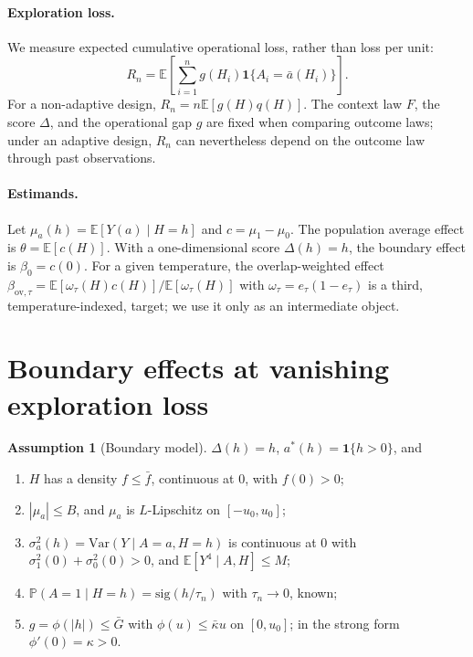 \documentclass[12pt]{article}
\theoremstyle{definition}
\newtheorem{assumption}{Assumption}
\theoremstyle{remark}
\newcommand{\E}{\mathbb{E}}
\newcommand{\Prob}{\mathbb{P}}
\newcommand{\Var}{\mathrm{Var}}
\newcommand{\ov}{\mathrm{ov}}
\newcommand{\sgm}{\mathrm{sig}}
\begin{document}
\paragraph{Exploration loss.}
We measure expected cumulative operational loss, rather than loss per unit:
\begin{equation}\label{eq:loss-definition}
 R_n=\E\left[\sum_{i=1}^n g(H_i)\mathbf 1\{A_i=\bar a(H_i)\}\right].
\end{equation}
For a non-adaptive design, $R_n=n\E[g(H)q(H)]$. The context law $F$, the score
$\Delta$, and the operational gap $g$ are fixed when comparing outcome laws;
under an adaptive design, $R_n$ can nevertheless depend on the outcome law
through past observations.

\paragraph{Estimands.} Let $\mu_a(h)=\E[Y(a)\mid H=h]$ and $c=\mu_1-\mu_0$.
The population average effect is $\theta=\E[c(H)]$. With a one-dimensional
score $\Delta(h)=h$, the boundary effect is $\beta_0=c(0)$. For a given
temperature, the overlap-weighted effect
$\beta_{\ov,\tau}=\E[\omega_\tau(H)c(H)]/\E[\omega_\tau(H)]$ with
$\omega_\tau=e_\tau(1-e_\tau)$ \cite{li2018balancing} is a third,
temperature-indexed, target; we use it only as an intermediate object.

\section{Boundary effects at vanishing exploration loss}\label{sec:boundary}

\begin{assumption}[Boundary model]\label{ass:D}
$\Delta(h)=h$, $a^*(h)=\mathbf 1\{h>0\}$, and
\begin{enumerate}[label=(D\arabic*),leftmargin=3em,itemsep=1pt]
\item $H$ has a density $f\le\bar f$, continuous at $0$, with $f(0)>0$;
\item $|\mu_a|\le B$, and $\mu_a$ is $L$-Lipschitz on $[-u_0,u_0]$;
\item $\sigma_a^2(h)=\Var(Y\mid A=a,H=h)$ is continuous at $0$ with
$\sigma_1^2(0)+\sigma_0^2(0)>0$, and $\E[Y^4\mid A,H]\le M$;
\item $\Prob(A=1\mid H=h)=\sgm(h/\tau_n)$ with $\tau_n\to0$, known;
\item $g=\phi(|h|)\le\bar G$ with $\phi(u)\le\bar\kappa u$ on $[0,u_0]$; in the
strong form $\phi'(0)=\kappa>0$.
\end{enumerate}
\end{assumption}
\end{document}
